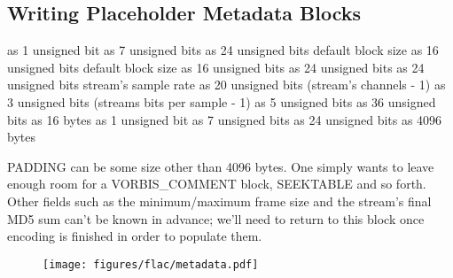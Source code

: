 \subsection{Writing Placeholder Metadata Blocks}
 as 1 unsigned bit
 as 7 unsigned bits
 as 24 unsigned bits
\WRITE default block size as 16 unsigned bits
\WRITE default block size as 16 unsigned bits
 as 24 unsigned bits
 as 24 unsigned bits
\WRITE stream's sample rate as 20 unsigned bits\;
\WRITE (stream's channels - 1) as 3 unsigned bits\;
\WRITE (streams bits per sample - 1) as 5 unsigned bits\;
 as 36 unsigned bits
 as 16 bytes
\BlankLine
\BlankLine
{} as 1 unsigned bit
 as 7 unsigned bits
 as 24 unsigned bits
 as 4096 bytes
\EALGORITHM
\par
\noindent
PADDING can be some size other than 4096 bytes.
One simply wants to leave enough room for a VORBIS\_COMMENT block,
SEEKTABLE and so forth.
Other fields such as the minimum/maximum frame size
and the stream's final MD5 sum can't be known in advance;
we'll need to return to this block once encoding is finished
in order to populate them.
\begin{figure}[h]
\texttt{[image: figures/flac/metadata.pdf]}
\end{figure}


\clearpage

